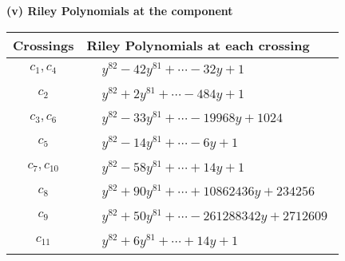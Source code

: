 \documentclass[1p]{elsarticle_modified}
\theoremstyle{definition}
\begin{document}
\newpage\renewcommand{\arraystretch}{1}
\flushleft \textbf{(v) Riley Polynomials at the component}\newline \\
\begin{tabular}{m{50pt}|m{274pt}}
Crossings & \hspace{64pt}Riley Polynomials at each crossing \\
\hline $$\begin{aligned}c_{1},c_{4}\end{aligned}$$&$\begin{aligned}
&y^{82}-42 y^{81}+\cdots-32 y+1
\end{aligned}$\\
\hline $$\begin{aligned}c_{2}\end{aligned}$$&$\begin{aligned}
&y^{82}+2 y^{81}+\cdots-484 y+1
\end{aligned}$\\
\hline $$\begin{aligned}c_{3},c_{6}\end{aligned}$$&$\begin{aligned}
&y^{82}-33 y^{81}+\cdots-19968 y+1024
\end{aligned}$\\
\hline $$\begin{aligned}c_{5}\end{aligned}$$&$\begin{aligned}
&y^{82}-14 y^{81}+\cdots-6 y+1
\end{aligned}$\\
\hline $$\begin{aligned}c_{7},c_{10}\end{aligned}$$&$\begin{aligned}
&y^{82}-58 y^{81}+\cdots+14 y+1
\end{aligned}$\\
\hline $$\begin{aligned}c_{8}\end{aligned}$$&$\begin{aligned}
&y^{82}+90 y^{81}+\cdots+10862436 y+234256
\end{aligned}$\\
\hline $$\begin{aligned}c_{9}\end{aligned}$$&$\begin{aligned}
&y^{82}+50 y^{81}+\cdots-261288342 y+2712609
\end{aligned}$\\
\hline $$\begin{aligned}c_{11}\end{aligned}$$&$\begin{aligned}
&y^{82}+6 y^{81}+\cdots+14 y+1
\end{aligned}$\\
\hline
\end{tabular}\\~\\
\end{document}
